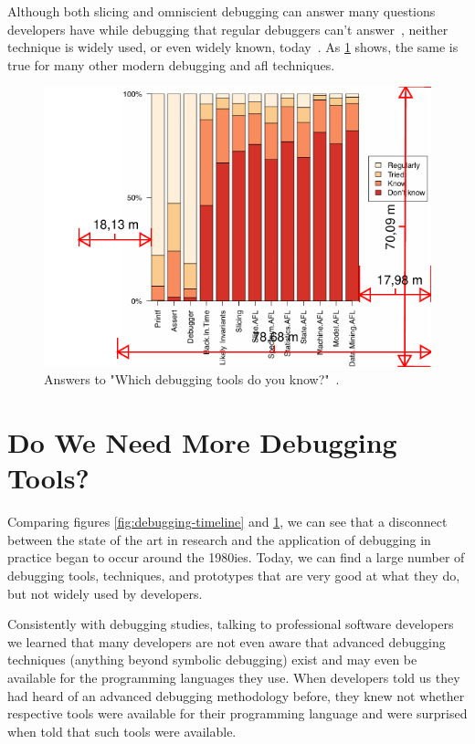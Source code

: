 Although both slicing and omniscient debugging can answer many questions developers have while debugging that regular debuggers can't answer~\cite{ko07:information_needs_in_collocated, storey97:how_do_program_understanding, sillito06:questions_programmers_ask}, neither technique is widely used, or even widely known, today~\cite{perscheid17:studying_the_advancement}.
As \cref{fig:tool-usage} shows, the same is true for many other modern debugging and \ac{afl} techniques.

\begin{figure}[t]
\centering
\includegraphics[width=.8\linewidth]{img/tool-usage}
\caption{Answers to "Which debugging tools do you know?"~\cite{perscheid17:studying_the_advancement}.}
\label{fig:tool-usage}
\end{figure}

\section{Do We Need More Debugging Tools?}

Comparing figures \ref{fig:debugging-timeline} and \ref{fig:tool-usage}, we can see that a disconnect between the state of the art in research and the application of debugging in practice began to occur around the 1980ies.
Today, we can find a large number of debugging tools, techniques, and prototypes that are very good at what they do, but not widely used by developers.

Consistently with debugging studies, talking to professional software developers we learned that many developers are not even aware that advanced debugging techniques (\ie anything beyond symbolic debugging) exist and may even be available for the programming languages they use.
When developers told us they had heard of an advanced debugging methodology before, they knew not whether respective tools were available for their programming language and were surprised when told that such tools were available.

